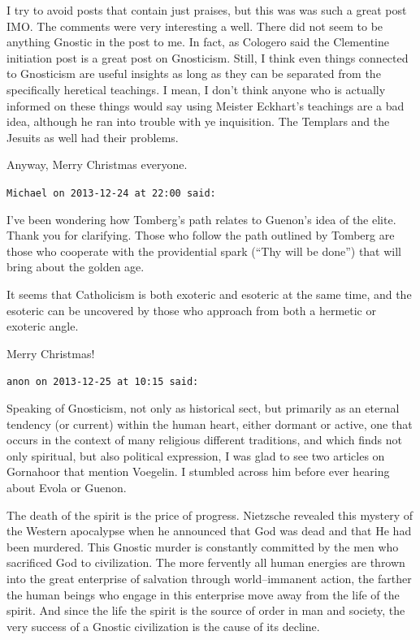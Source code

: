 \begin{footnotesize}
\begin{sffamily}
I try to avoid posts that contain just praises, but this was was such a great post IMO. The comments were very
interesting a well. There did not seem to be anything Gnostic in the post to me. In fact, as Cologero said the
Clementine initiation post is a great post on Gnosticism. Still, I think even things connected to Gnosticism are useful
insights as long as they can be separated from the specifically heretical teachings. I mean, I
don't think anyone who is actually informed on these things would say using Meister
Eckhart's teachings are a bad idea, although he ran into trouble with ye inquisition. The Templars
and the Jesuits as well had their problems. 

Anyway, Merry Christmas everyone.

\hfill

\texttt{Michael on 2013-12-24 at 22:00 said: }

I've been wondering how Tomberg's path relates to
Guenon's idea of the elite. Thank you for clarifying. Those who follow the path outlined by
Tomberg are those who cooperate with the providential spark (“Thy will be done”) that will bring about the golden age.

It seems that Catholicism is both exoteric and esoteric at the same time, and the esoteric can be uncovered by those who
approach from both a hermetic or exoteric angle.

Merry Christmas!

\hfill

\texttt{anon on 2013-12-25 at 10:15 said: }

Speaking of Gnosticism, not only as historical sect, but primarily as an eternal tendency (or current) within the human
heart, either dormant or active, one that occurs in the context of many religious different traditions, and which finds
not only spiritual, but also political expression, I was glad to see two articles on Gornahoor that mention Voegelin. I
stumbled across him before ever hearing about Evola or Guenon.

\begin{quotationx}\scriptsize

The death of the spirit is the price of progress. Nietzsche revealed this mystery of the Western apocalypse when he
announced that God was dead and that He had been murdered. This Gnostic murder is constantly committed by the men who
sacrificed God to civilization. The more fervently all human energies are thrown into the great enterprise of salvation
through world–immanent action, the farther the human beings who engage in this enterprise move away from the life of
the spirit. And since the life the spirit is the source of order in man and society, the very success of a Gnostic
civilization is the cause of its decline.


\end{quotationx}
\end{sffamily}
\end{footnotesize}
